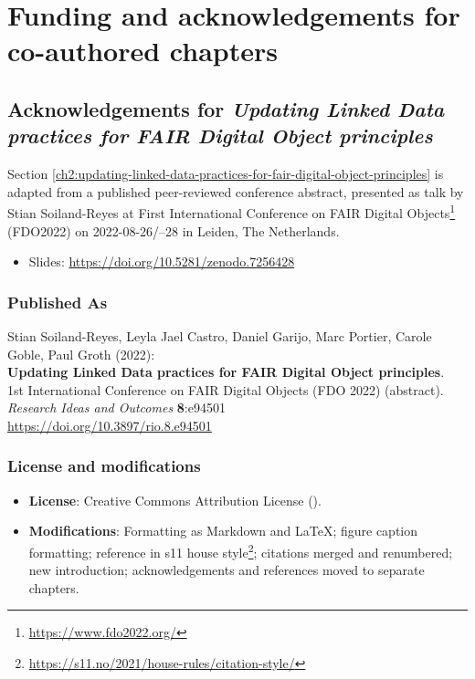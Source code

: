 \section{Funding and acknowledgements for co-authored chapters}



\subsection{Acknowledgements for \textit{Updating Linked Data practices for FAIR Digital Object principles}}


Section \ref{ch2:updating-linked-data-practices-for-fair-digital-object-principles} is adapted from a published peer-reviewed conference abstract,
presented as talk by Stian Soiland-Reyes at 
First International Conference on FAIR Digital Objects\footnote{\url{https://www.fdo2022.org/}} 
(FDO2022) on
2022-08-26/--28 in Leiden, The Netherlands. 


\begin{itemize}
    \item Slides: \url{https://doi.org/10.5281/zenodo.7256428}
\end{itemize}

\subsubsection*{Published As}

Stian Soiland-Reyes, Leyla Jael Castro, Daniel Garijo, Marc Portier, Carole Goble, Paul Groth (2022):\\
\textbf{Updating Linked Data practices for FAIR Digital Object principles}.\\
1st International Conference on FAIR Digital Objects (FDO 2022) (abstract).\\
\textit{Research Ideas and Outcomes} \textbf{8}:e94501\\
\url{https://doi.org/10.3897/rio.8.e94501}


\subsubsection*{License and modifications}

\begin{itemize}
\tightlist
\item
  \textbf{License}: Creative Commons Attribution License
  ().
\item
  \textbf{Modifications}: Formatting as Markdown and LaTeX; figure caption
		formatting; reference in s11 house style\footnote{\url{https://s11.no/2021/house-rules/citation-style/}}; citations merged and renumbered; new introduction;
  acknowledgements and references moved to separate chapters.
\end{itemize}


